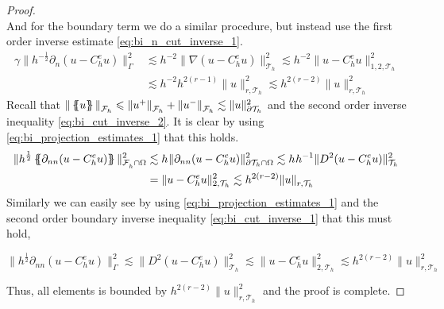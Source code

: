 \begin{proof}
\begin{equation}
            \end{equation}
    And for the boundary term we do a similar procedure, but instead use the first order inverse estimate \eqref{eq:bi_n_cut_inverse_1}.
        \begin{equation}
        \begin{split}
            \gamma \| h^{-\frac{1}{2}}  \partial _{n} ( u - C_{h}^{e}u ) \|_{ \Gamma    }^{  2} & \lesssim h^{-2} \|   \nabla  ( u - C_{h}^{e}u )    \|_{ \mathcal{T}_{h} }^{2  }  \lesssim  h^{-2} \|    u - C_{h}^{e}u     \|_{1,2, \mathcal{T}_{h}   }^{2  } \\
            & \lesssim h^{-2} h^{2(r-1)}   \| u \|_{r, \mathcal{T}_{h}   }^{  2}  \lesssim  h^{2(r- 2)}   \| u \|_{r, \mathcal{T}_{h}   }^{  2}
        \end{split}
        \end{equation}
            Recall that $\| \left\{\!\!\left\{ u \right\}\!\!\right\}   \|_{ \mathcal{F} _{h} }^{  } \leqslant \| u^{+} \|_{ \mathcal{F} _{h}  }^{  } + \| u^{-} \|_{ \mathcal{F} _{h}  }^{  }   \lesssim  \| u \|_{ \partial\mathcal{T }_{h}  }^{2  }  $ and the second order inverse
            inequality \eqref{eq:bi_cut_inverse_2}. It is clear
            by using \eqref{eq:bi_projection_estimates_1} that this holds.
            \begin{equation}
                \begin{split}
 \| h^{\frac{1}{2}} \left\{\!\!\left\{ \partial _{nn} (u - C_{h}^{e}u) \right\}\!\!\right\}   \|_{\mathcal{F} _{h}^{} \cap \Omega   }^{  2} &  \lesssim h^{} \|   \partial _{nn} (u - C_{h}^{e}u)    \|_{\partial \mathcal{T} _{h} \cap \Omega    }^{  2}  \lesssim h^{} h^{-1}  \|   D^2 (u - C_{h}^{e}u)    \|_{ \mathcal{T} _{h}   }^{  2} \\
                                                                                                                &  = \|   u - C_{h}^{e}u    \|_{ 2, \mathcal{T} _{h}   }^{  2}  \lesssim h^{2(r - 2)}  \| u \|_{r, \mathcal{T} _{h} }^{  }
                \end{split}
            \end{equation}
                Similarly we can easily see by using \eqref{eq:bi_projection_estimates_1} and the second order boundary inverse inequality  \eqref{eq:bi_cut_inverse_1} that this must hold,

                \begin{equation}
              \| h^{\frac{1}{2}} \partial _{nn}(u - C_{h}^{e}u)     \|_{ \Gamma }^{  2} \lesssim   \|  D^2(u - C_{h}^{e}u)     \|_{ \mathcal{T}_{h}   }^{  2} \lesssim \|  u - C_{h}^{e}u \|_{ 2, \mathcal{T}_{h} }^{2  } \lesssim h^{2(r-2)}  \| u \|_{ r, \mathcal{T}_{h}   }^{2  }
                \end{equation}

    Thus, all elements is bounded by $ h^{2(r-2)}  \| u \|_{ r, \mathcal{T}_{h}   }^{2  } $  and the proof is complete.
\end{proof}

